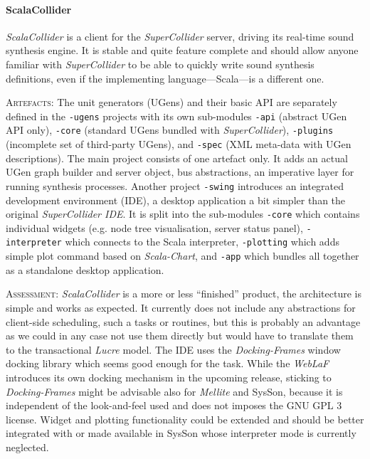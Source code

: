 \documentclass[11pt,a4paper]{article}
\newcommand{\software}[1]{\textit{#1}}
\newcommand{\sysson}[0]{SysSon}
\newcommand{\artefacts}[0]{\textsc{Artefacts:}}
\newcommand{\assessment}[0]{\textsc{Assessment:}}
\begin{document}
\paragraph{ScalaCollider}

\software{ScalaCollider} is a client for the \software{SuperCollider} server, driving its real-time sound synthesis engine. It is stable and quite feature complete and should allow anyone familiar with \software{SuperCollider} to be able to quickly write sound synthesis definitions, even if the implementing language---Scala---is a different one.

\artefacts{} The unit generators (UGens) and their basic API are separately defined in the \verb!-ugens! projects with its own sub-modules \verb!-api! (abstract UGen API only), \verb!-core! (standard UGens bundled with \software{SuperCollider}), \verb!-plugins! (incomplete set of third-party UGens), and \verb!-spec! (XML meta-data with UGen descriptions). The main project consists of one artefact only. It adds an actual UGen graph builder and server object, bus abstractions, an imperative layer for running synthesis processes. Another project \verb!-swing! introduces an integrated development environment (IDE), a desktop application a bit simpler than the original \software{SuperCollider IDE}. It is split into the sub-modules \verb!-core! which contains individual widgets (e.g. node tree visualisation, server status panel), \verb!-interpreter! which connects to the Scala interpreter, \verb!-plotting! which adds simple plot command based on \software{Scala-Chart}, and \verb!-app! which bundles all together as a standalone desktop application.

\assessment{} \software{ScalaCollider} is a more or less ``finished'' product, the architecture is simple and works as expected. It currently does not include any abstractions for client-side scheduling, such a tasks or routines, but this is probably an advantage as we could in any case not use them directly but would have to translate them to the transactional \software{Lucre} model. The IDE uses the \software{Docking-Frames} window docking library which seems good enough for the task. While the \software{WebLaF} introduces its own docking mechanism in the upcoming release, sticking to \software{Docking-Frames} might be advisable also for \software{Mellite} and \sysson{}, because it is independent of the look-and-feel used and does not imposes the GNU GPL 3 license. Widget and plotting functionality could be extended and should be better integrated with or made available in \sysson{} whose interpreter mode is currently neglected.
\end{document}
